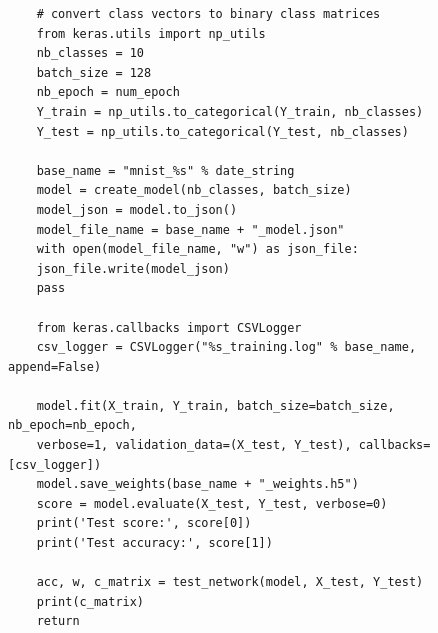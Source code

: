 \documentclass[paper=a4, fontsize=11pt]{scrartcl} %
\begin{document}
\begin{lstlisting}
    # convert class vectors to binary class matrices
    from keras.utils import np_utils
    nb_classes = 10
    batch_size = 128
    nb_epoch = num_epoch
    Y_train = np_utils.to_categorical(Y_train, nb_classes)
    Y_test = np_utils.to_categorical(Y_test, nb_classes)

    base_name = "mnist_%s" % date_string
    model = create_model(nb_classes, batch_size)
    model_json = model.to_json()
    model_file_name = base_name + "_model.json"
    with open(model_file_name, "w") as json_file:
    json_file.write(model_json)
    pass
    
    from keras.callbacks import CSVLogger
    csv_logger = CSVLogger("%s_training.log" % base_name, append=False)
    
    model.fit(X_train, Y_train, batch_size=batch_size, nb_epoch=nb_epoch,
    verbose=1, validation_data=(X_test, Y_test), callbacks=[csv_logger])
    model.save_weights(base_name + "_weights.h5")
    score = model.evaluate(X_test, Y_test, verbose=0)
    print('Test score:', score[0])
    print('Test accuracy:', score[1])

    acc, w, c_matrix = test_network(model, X_test, Y_test)
    print(c_matrix)
    return

\end{lstlisting}


\end{document}
